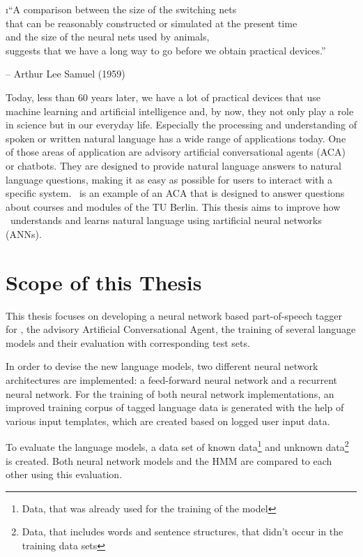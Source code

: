 \vspace{1em}
\i{``A comparison between the size of the switching nets\\that can be reasonably constructed or simulated at the present time\\and the size of the neural nets used by animals,\\suggests that we have a long way to go before we obtain practical devices.''}\\
\parbox{\textwidth}{\hfill \hfill -- Arthur Lee Samuel (1959)}
\vspace{.5em}

Today, less than 60 years later, we have a lot of practical devices that use machine learning and artificial intelligence and, by now, they not only play a role in science but in our everyday life. Especially the processing and understanding of spoken or written natural language has a wide range of applications today. One of those areas of application are advisory artificial conversational agents (ACA) or chatbots. They are designed to provide natural language answers to natural language questions, making it as easy as possible for users to interact with a specific system. \Alex\ is an example of an ACA that is designed to answer questions about courses and modules of the TU Berlin. This thesis aims to improve how \Alex\ understands and learns natural language using \i{artificial neural networks} (ANNs).

\section{Scope of this Thesis}\label{c.introduction.scope}
This thesis focuses on developing a neural network based part-of-speech tagger for \Alex, the advisory Artificial Conversational Agent, the training of several language models and their evaluation with corresponding test sets.

In order to devise the new language models, two different neural network architectures are implemented: a feed-forward neural network and a recurrent neural network. For the training of both neural network implementations, an improved training corpus of tagged language data is generated with the help of various input templates, which are created based on logged user input data.

To evaluate the language models, a data set of known data\footnote{Data, that was already used for the training of the model} and unknown data\footnote{Data, that includes words and sentence structures, that didn't occur in the training data sets} is created. Both neural network models and the HMM are compared to each other using this evaluation.

